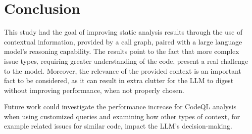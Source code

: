 \section{Conclusion}
\label{sec:conclusion}

This study had the goal of improving static analysis results through the use of contextual information, provided by a call graph, paired with a large language model's reasoning capability. The results point to the fact that more complex issue types, requiring greater understanding of the code, present a real challenge to the model. Moreover, the relevance of the provided context is an important fact to be considered, as it can result in extra clutter for the LLM to digest without improving performance, when not properly chosen.

Future work could investigate the performance increase for CodeQL analysis when using customized queries and examining how other types of context, for example related issues for similar code, impact the LLM's decision-making.